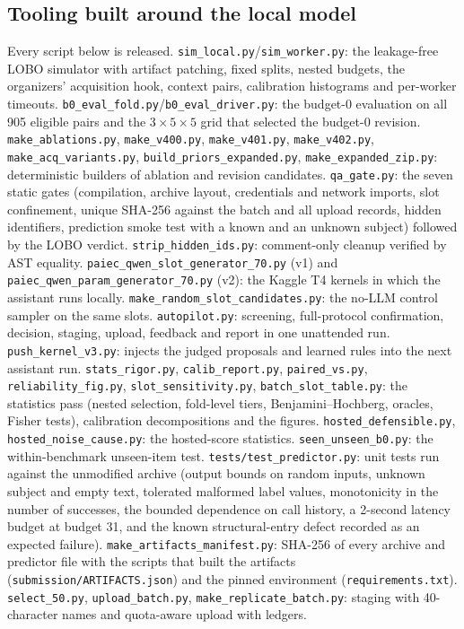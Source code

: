 \documentclass{article}
\begin{document}
\subsection{Tooling built around the local model}
Every script below is released. \texttt{sim\_local.py}/\texttt{sim\_worker.py}: the leakage-free LOBO simulator with artifact patching, fixed splits, nested budgets, the organizers' acquisition hook, context pairs, calibration histograms and per-worker timeouts. \texttt{b0\_eval\_fold.py}/\texttt{b0\_eval\_driver.py}: the budget-0 evaluation on all 905 eligible pairs and the $3\times5\times5$ grid that selected the budget-0 revision. \texttt{make\_ablations.py}, \texttt{make\_v400.py}, \texttt{make\_v401.py}, \texttt{make\_v402.py}, \texttt{make\_acq\_variants.py}, \texttt{build\_priors\_expanded.py}, \texttt{make\_expanded\_zip.py}: deterministic builders of ablation and revision candidates. \texttt{qa\_gate.py}: the seven static gates (compilation, archive layout, credentials and network imports, slot confinement, unique SHA-256 against the batch and all upload records, hidden identifiers, prediction smoke test with a known and an unknown subject) followed by the LOBO verdict. \texttt{strip\_hidden\_ids.py}: comment-only cleanup verified by AST equality. \texttt{paiec\_qwen\_slot\_generator\_70.py} (v1) and \texttt{paiec\_qwen\_param\_generator\_70.py} (v2): the Kaggle T4 kernels in which the assistant runs locally. \texttt{make\_random\_slot\_candidates.py}: the no-LLM control sampler on the same slots. \texttt{autopilot.py}: screening, full-protocol confirmation, decision, staging, upload, feedback and report in one unattended run. \texttt{push\_kernel\_v3.py}: injects the judged proposals and learned rules into the next assistant run. \texttt{stats\_rigor.py}, \texttt{calib\_report.py}, \texttt{paired\_vs.py}, \texttt{reliability\_fig.py}, \texttt{slot\_sensitivity.py}, \texttt{batch\_slot\_table.py}: the statistics pass (nested selection, fold-level tiers, Benjamini--Hochberg, oracles, Fisher tests), calibration decompositions and the figures. \texttt{hosted\_defensible.py}, \texttt{hosted\_noise\_cause.py}: the hosted-score statistics. \texttt{seen\_unseen\_b0.py}: the within-benchmark unseen-item test. \texttt{tests/test\_predictor.py}: unit tests run against the unmodified archive (output bounds on random inputs, unknown subject and empty text, tolerated malformed label values, monotonicity in the number of successes, the bounded dependence on call history, a 2-second latency budget at budget 31, and the known structural-entry defect recorded as an expected failure). \texttt{make\_artifacts\_manifest.py}: SHA-256 of every archive and predictor file with the scripts that built the artifacts (\texttt{submission/ARTIFACTS.json}) and the pinned environment (\texttt{requirements.txt}). \texttt{select\_50.py}, \texttt{upload\_batch.py}, \texttt{make\_replicate\_batch.py}: staging with 40-character names and quota-aware upload with ledgers.
\end{document}
